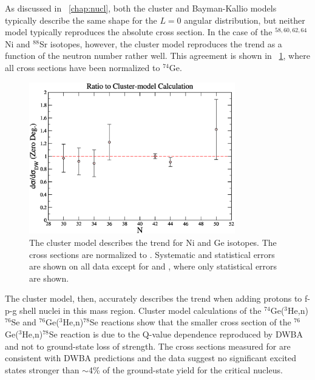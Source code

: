 As discussed in {\chap}~\ref{chap:nucl}, both the cluster and Bayman-Kallio models typically describe the same shape for the $L=0$ angular distribution, but neither model typically reproduces the absolute cross section.  In the case of the $^{58,60,62,64}$Ni and $^{88}$Sr isotopes, however, the cluster model reproduces the trend as a function of the neutron number rather well.  This agreement is shown in {\fig}~\ref{fig:nickelTrend}, where all cross sections have been normalized to $^{74}$Ge.  
\begin{figure}[!htbp]
\centering
\includegraphics[width=0.8\textwidth]{figures/SigmaNormVsN.eps}
\caption[Deviation from the best DWBA fit for other $f-p-g$ isotopes.]{The cluster model describes the trend for Ni and Ge isotopes.  The cross sections are normalized to .  Systematic and statistical errors are shown on all data except for  and , where only statistical errors are shown.}
\label{fig:nickelTrend}
\end{figure}
The cluster model, then, accurately describes the trend when adding protons to f-p-g shell nuclei in this mass region.  Cluster model calculations of the $^{74}$Ge($^3$He,n)$^{76}$Se and $^{76}$Ge($^3$He,n)$^{78}$Se reactions show that the smaller cross section of the $^{76}$Ge($^3$He,n)$^{78}$Se reaction is due to the Q-value dependence reproduced by DWBA and not to ground-state loss of \zp strength.   The cross sections measured for \reaction are consistent with DWBA predictions and the data suggest no significant excited \zp states stronger than $\sim$4\% of the ground-state yield for the critical  nucleus.

%
% 
% 

